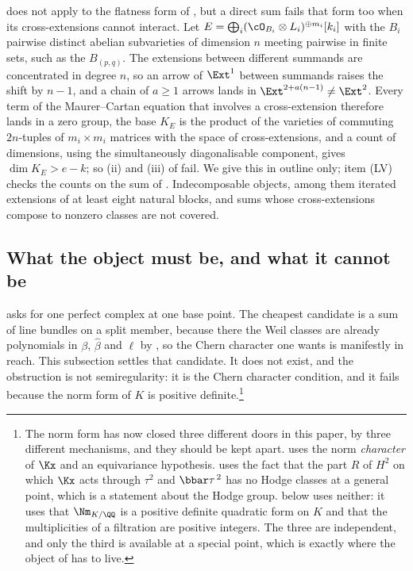 \begin{remark}\label{rem:flatsums}
 does not apply to the flatness form of
, but a direct sum fails that form too when its
cross-extensions cannot interact. Let $E=\bigoplus_{i}(\cO_{B_{i}}\otimes
L_{i})^{\oplus m_{i}}[k_{i}]$ with the $B_{i}$ pairwise distinct abelian
subvarieties of dimension $n$ meeting pairwise in finite sets, such as the
$B_{(p,q)}$. The extensions between different summands are concentrated in
degree $n$, so an arrow of $\Ext^{1}$ between summands raises the shift by
$n-1$, and a chain of $a\ge1$ arrows lands in $\Ext^{2+a(n-1)}\ne\Ext^{2}$.
Every term of the Maurer--Cartan equation that involves a cross-extension
therefore lands in a zero group, the base $K_{E}$ is the product of the
varieties of commuting $2n$-tuples of $m_{i}\times m_{i}$ matrices with the
space of cross-extensions, and a count of dimensions, using the
simultaneously diagonalisable component, gives $\dim K_{E}>e-k$; so (ii) and
(iii) of  fail. We give this in outline only; item (LV)
checks the counts on the sum of . Indecomposable objects,
among them iterated extensions of at least eight natural blocks, and sums
whose cross-extensions compose to nonzero classes are not covered.
\end{remark}

\subsection{What the object must be, and what it cannot be}
\label{ssec:whatobject}

 asks for one perfect complex at one base point.
The cheapest candidate is a sum of line bundles on a split member, because
there the Weil classes are already polynomials in $\beta$, $\widehat\beta$ and
$\ell$ by , so the Chern character one wants is
manifestly in reach. This subsection settles that candidate. It does not
exist, and the obstruction is not semiregularity: it is the Chern character
condition, and it fails because the norm form of $K$ is positive
definite.\footnote{The norm form has now closed three different doors in this
paper, by three different mechanisms, and they should be kept apart.
 uses the norm \emph{character} of $\Kx$ and an
equivariance hypothesis.  uses the fact that the part $R$
of $H^{2}$ on which $\Kx$ acts through $\tau^{2}$ and $\bbar\tau^{\,2}$ has no
Hodge classes at a general point, which is a statement about the Hodge group.
 below uses neither: it uses that $\Nm_{K/\QQ}$ is a
positive definite quadratic form on $K$ and that the multiplicities of a
filtration are positive integers. The three are independent, and only the
third is available at a special point, which is exactly where the object of
 has to live.}

